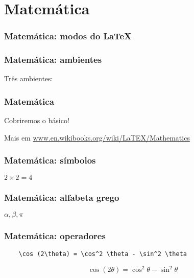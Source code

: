 \section{Matemática}

\begin{frame}
  \frametitle{Matemática: modos do \LaTeX}
  \LARGE
\end{frame}

\begin{frame}[fragile]
  \frametitle{Matemática: ambientes}
  \LARGE
  Três ambientes:\\

\end{frame}

\begin{frame}
  \frametitle{Matemática}
  \LARGE
  Cobriremos o básico!

  Mais em \url{www.en.wikibooks.org/wiki/LaTEX/Mathematics}
\end{frame}

\begin{frame}[fragile]
  \frametitle{Matemática: símbolos}
  \LARGE
  \hfill
  \( 2 \times 2 = 4 \)
\end{frame}

\begin{frame}[fragile]
  \frametitle{Matemática: alfabeta grego}
  \LARGE
  \latexcode{\alpha, \beta, \pi}
  \hfill
  \( \alpha, \beta, \pi \)
\end{frame}

\begin{frame}[fragile]
  \frametitle{Matemática: operadores}
  \begin{verbatim}
    \cos (2\theta) = \cos^2 \theta - \sin^2 \theta
  \end{verbatim}

  \LARGE
  \[ \cos (2\theta) = \cos^2 \theta - \sin^2 \theta \]
\end{frame}

